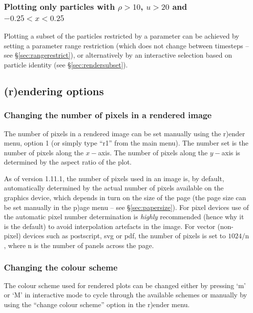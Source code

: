 \documentclass[a4paper,10pt]{article}
\begin{document}
\subsubsection{ Plotting only particles with $\rho > 10$, $u > 20$ and $-0.25 < x < 0.25$}
 Plotting a subset of the particles restricted by a parameter can be achieved by setting a parameter range restriction (which does not change between timesteps -- see \S\ref{sec:rangerestrict}), or alternatively by an interactive selection based on particle identity (see \S\ref{sec:rendersubset}).


\subsection{(r)endering options}%
\subsubsection{ Changing the number of pixels in a rendered image}
 The number of pixels in a rendered image can be set manually using the r)ender menu, option 1 (or simply type ``r1'' from the main menu). The number set is the number of pixels along the $x-$axis. The number of pixels along the $y-$axis is determined by the aspect ratio of the plot.

 As of version 1.11.1, the number of pixels used in an image is, by default, automatically determined by the actual number of pixels available on the graphics device, which depends in turn on the size of the page (the page size can be set manually in the p)age menu -- see \S\ref{sec:papersize}). For pixel devices use of the automatic pixel number determination is \emph{highly} recommended (hence why it is the default) to avoid interpolation artefacts in the image. For vector (non-pixel) devices such as postscript, svg or pdf, the number of pixels is set to $1024/\textrm{n}$, where n is the number of panels across the page. 

\subsubsection{ Changing the colour scheme}
 The colour scheme used for rendered plots can be changed either by pressing `m' or `M' in interactive mode to cycle through the available schemes or manually by using the ``change colour scheme'' option in the r)ender menu.
\end{document}
